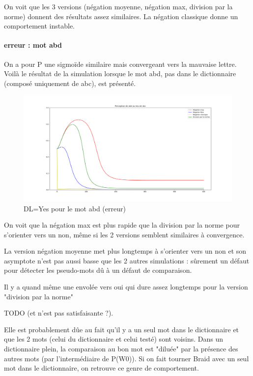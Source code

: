 \documentclass{article}
\begin{document}
On voit que les 3 versions (négation moyenne, négation max, division par la norme) donnent des résultats assez similaires. La négation classique donne un comportement instable.
    
\paragraph{erreur : mot abd}
On a pour P une sigmoïde similaire mais convergeant vers la mauvaise lettre.
Voilà le résultat de la simulation lorsque le mot abd, pas dans le dictionnaire (composé uniquement de abc), est présenté.

\begin{figure}[H]
\centering
	\includegraphics[scale=0.3]{abd.png}
	\caption{DL=Yes pour le mot abd (erreur)}
\end{figure} 

On voit que la négation max est plus rapide que la division par la norme pour s'orienter vers un non, même si les 2 versions semblent similaires à convergence. 

La version négation moyenne met plus longtemps à s'orienter vers un non et son asymptote n'est pas aussi basse que les 2 autres simulations : sûrement un défaut pour détecter les pseudo-mots dû à un défaut de comparaison.

Il y a quand même une envolée vers oui qui dure assez longtemps pour la version "division par la norme" 

TODO (et n'est pas satisfaisante ?). 

Elle est probablement dûe au fait qu'il y a un seul mot dans le dictionnaire et que les 2 mots (celui du dictionnaire et celui testé) sont voisins. Dans un dictionnaire plein, la comparaison au bon mot est "diluée" par la présence des autres mots (par l'intermédiaire de P(W0)). Si on fait tourner Braid avec un seul mot dans le dictionnaire, on retrouve ce genre de comportement. 
\end{document}
